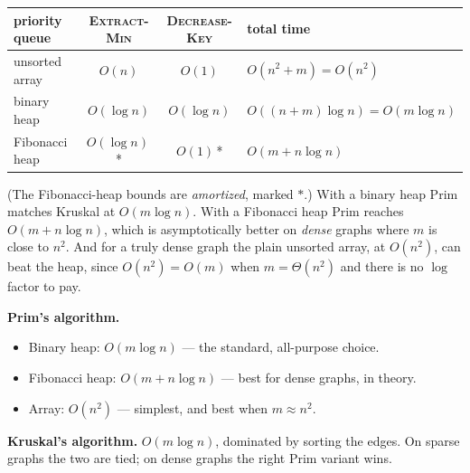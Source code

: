 \begin{center}
\renewcommand{\arraystretch}{1.35}
\begin{tabular}{l c c l}
\toprule
priority queue & \textsc{Extract-Min} & \textsc{Decrease-Key} & total time \\
\midrule
unsorted array      & $O(n)$        & $O(1)$           & $O(n^2 + m) = O(n^2)$ \\
binary heap         & $O(\log n)$   & $O(\log n)$      & $O((n+m)\log n) = O(m\log n)$ \\
Fibonacci heap      & $O(\log n)$\,* & $O(1)$\,*        & $O(m + n\log n)$ \\
\bottomrule
\end{tabular}
\end{center}

(The Fibonacci-heap bounds are \emph{amortized}, marked $*$.) With a binary heap
Prim matches Kruskal at $O(m \log n)$. With a Fibonacci heap Prim reaches
$O(m + n\log n)$, which is asymptotically better on \emph{dense} graphs where
$m$ is close to $n^2$. And for a truly dense graph the plain unsorted array,
at $O(n^2)$, can beat the heap, since $O(n^2) = O(m)$ when $m = \Theta(n^2)$ and
there is no $\log$ factor to pay.

\begin{complexitybox}
\textbf{Prim's algorithm.}
\begin{itemize}
\item Binary heap: $O(m \log n)$ --- the standard, all-purpose choice.
\item Fibonacci heap: $O(m + n \log n)$ --- best for dense graphs, in theory.
\item Array: $O(n^2)$ --- simplest, and best when $m \approx n^2$.
\end{itemize}
\textbf{Kruskal's algorithm.} $O(m \log n)$, dominated by sorting the edges.
On sparse graphs the two are tied; on dense graphs the right Prim variant wins.
\end{complexitybox}

